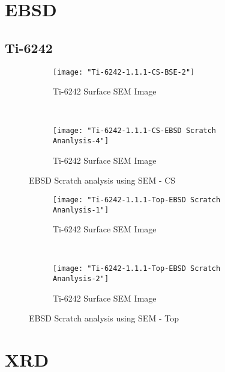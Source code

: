 \newpage
\renewcommand{\workingDate}{\textsc{2017 $|$ September $|$ 14}}
\section{EBSD}
\subsection{Ti-6242}

\begin{figure}[H]
    \centering
    \begin{subfigure}{0.49\textwidth}
        \texttt{[image: "Ti-6242-1.1.1-CS-BSE-2"]}
        \caption{Ti-6242 Surface SEM Image}
        \label{fig:Ti-6242 Williamson-Hall Plot}
    \end{subfigure}
    ~
    \begin{subfigure}{0.49\textwidth}
        \texttt{[image: "Ti-6242-1.1.1-CS-EBSD Scratch Ananlysis-4"]}
        \caption{Ti-6242 Surface SEM Image}
        \label{fig:Ti-6242 Williamson-Hall Plot}
    \end{subfigure}
  
    \caption{EBSD Scratch analysis using SEM - CS}
    \label{fig:EBSD Scratch analysis using SEM - CS}
\end{figure}

\begin{figure}[H]
    \centering
    \begin{subfigure}{0.49\textwidth}
        \texttt{[image: "Ti-6242-1.1.1-Top-EBSD Scratch Ananlysis-1"]}
        \caption{Ti-6242 Surface SEM Image}
        \label{fig:Ti-6242 Williamson-Hall Plot}
    \end{subfigure}
    ~
    \begin{subfigure}{0.49\textwidth}
        \texttt{[image: "Ti-6242-1.1.1-Top-EBSD Scratch Ananlysis-2"]}
        \caption{Ti-6242 Surface SEM Image}
        \label{fig:Ti-6242 Williamson-Hall Plot}
    \end{subfigure}
  
    \caption{EBSD Scratch analysis using SEM - Top}
    \label{fig:EBSD Scratch analysis using SEM - Top}
\end{figure}

\section{XRD}
